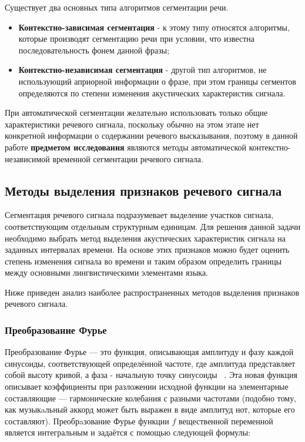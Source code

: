 \documentclass[utf8x, 14pt, oneside, a4paper]{article}
\begin{document}
	Существует два основных типа алгоритмов сегментации речи. 
	
	\begin{itemize}
		\item {\bf Контекстно-зависимая сегментация} - к этому типу относятся алгоритмы, которые производят сегментацию речи при условии, что известна последовательность фонем данной фразы;
		\item {\bf Контекстно-независимая сегментация} - другой тип алгоритмов, не использующий априорной информации о фразе, при этом границы сегментов определяются по степени изменения акустических характеристик сигнала.
	\end{itemize}
	
	При автоматической сегментации желательно использовать только общие характеристики речевого сигнала, поскольку обычно на этом этапе нет конкретной информации о содержании речевого высказывания, поэтому в данной работе {\bf предметом исследования} являются методы автоматической контекстно-независимой временной сегментации речевого сигнала.
	
	\subsection{Методы выделения признаков речевого сигнала}
	
	Сегментация речевого сигнала подразумевает выделение участков сигнала,
	соответствующим отдельным структурным единицам. Для решения данной задачи необходимо выбрать метод выделения акустических характеристик сигнала на заданных интервалах времени. На основе этих признаков можно будет оценить степень изменения сигнала во времени и таким образом определить границы между основными лингвистическими элементами языка.
	
	Ниже приведен анализ наиболее распространенных методов выделения признаков речевого сигнала.
	
	\subsubsection{Преобразование Фурье}
	
	Преобразование Фурье — это функция, описывающая амплитуду
	и фазу каждой синусоиды, соответствующей определённой частоте, где амплитуда представляет собой высоту кривой, а фаза - начальную
	точку синусоиды ~\cite{magistr}. Эта новая функция описывает коэффициенты при разложении исходной функции на элементарные составляющие — гармонические колебания с разными частотами (подобно
	тому, как музыкaльный аккорд может быть выражен в виде амплитуд нот,
	которые его составляют).
	Преобрaзование Фурье функции $f$ вещественной переменной
	является интегральным и задаётся с помощью следующей формулы:
	
\end{document}
